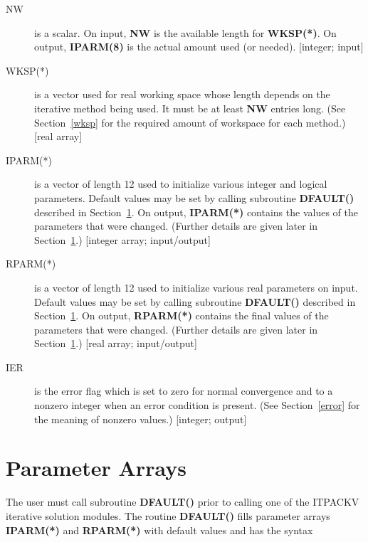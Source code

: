 \begin{description}
 \item[NW] is a scalar.  On input, {\bf NW} is the available length for 
           {\bf WKSP(*)}.  On output, {\bf IPARM(8)} is the actual 
           amount used (or needed).  [integer; input] 

 \item[WKSP(*)] is a vector used for real working space whose length depends 
                on the iterative method being used.  It must be at least 
                {\bf NW} entries long.  (See Section~\ref{wksp} for the 
                required amount of workspace for each method.) [real array] 

 \item[IPARM(*)] is a vector of length 12 used to initialize various 
                 integer and logical parameters.  Default values may be 
                 set by calling subroutine {\bf DFAULT()} described 
                 in Section~\ref{params}.  On output, {\bf IPARM(*)} 
                 contains the values of the parameters that were changed.
                 (Further details are given later in 
                 Section~\ref{params}.)  [integer array; input/output] 

 \item[RPARM(*)] is a vector of length 12 used to initialize various real 
                 parameters on input.  Default values may be set by 
                 calling subroutine {\bf DFAULT()} described in
                 Section~\ref{params}.  On output, {\bf RPARM(*)} contains 
                 the final values of the parameters that were changed.
                 (Further details are given later in Section~\ref{params}.)
                 [real array; input/output] 

 \item[IER] is the error flag which is set to zero for normal convergence 
            and to a nonzero integer when an error condition is present.
            (See Section~\ref{error} for the meaning of nonzero values.)
            [integer; output] 

\end{description}
\bigskip
 

\section{Parameter Arrays}
\label{params}
 
The user must call subroutine {\bf DFAULT()} prior to calling one of the 
ITPACKV iterative solution modules.  The routine {\bf DFAULT()} fills 
parameter arrays {\bf IPARM(*)} and {\bf RPARM(*)} with default values 
and has the syntax

